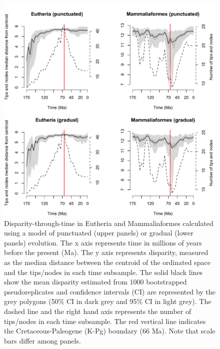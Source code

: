 \documentclass[12pt,letterpaper]{article}
\begin{document}
\begin{figure}[!htbp]
\centering
    \includegraphics[keepaspectratio=true]{Figures/Main_results.pdf}
\caption{\scriptsize{Disparity-through-time in Eutheria and Mammaliaformes calculated using a model of punctuated (upper panels) or gradual (lower panels) evolution. The x axis represents time in millions of years before the present (Ma). The y axis represents disparity, measured as the median distance between the centroid of the ordinated space and the tips/nodes in each time subsample. The solid black lines show the mean disparity estimated from 1000 bootstrapped pseudoreplicates and confidence intervals (CI) are represented by the grey polygons (50\% CI in dark grey and 95\% CI in light grey). The dashed line and the right hand axis represents the number of tips/nodes in each time subsample. The red vertical line indicates the Cretaceous-Paleogene (K-Pg) boundary (66 Ma). Note that scale bars differ among panels.}}
\label{fig:Fig_Raw_results}
\end{figure}
\end{document}
